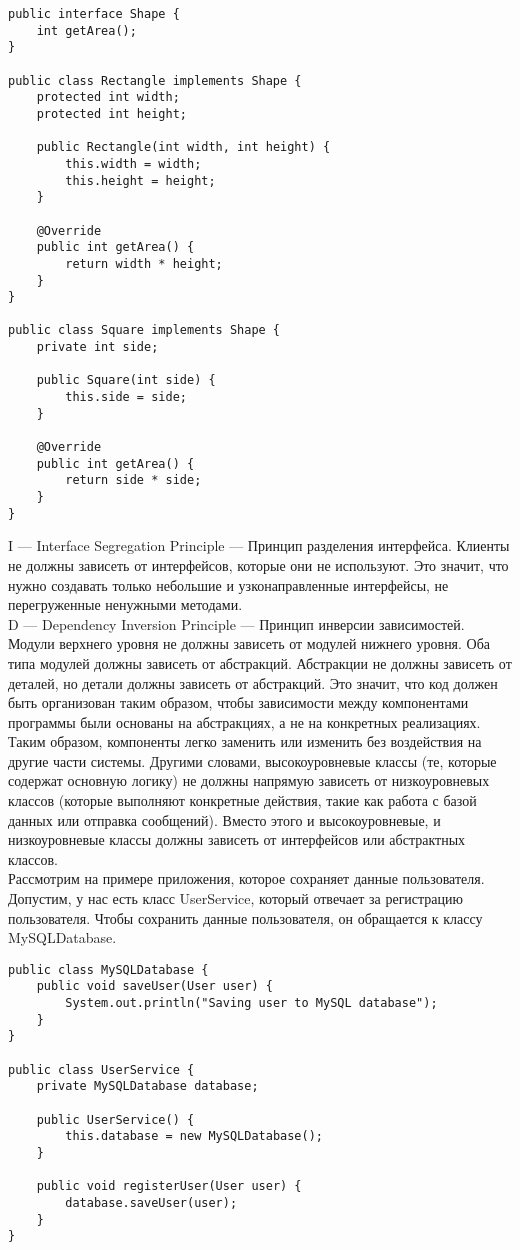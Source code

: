 \begin{lstlisting}
public interface Shape {
    int getArea();
}

public class Rectangle implements Shape {
    protected int width;
    protected int height;

    public Rectangle(int width, int height) {
        this.width = width;
        this.height = height;
    }

    @Override
    public int getArea() {
        return width * height;
    }
}

public class Square implements Shape {
    private int side;

    public Square(int side) {
        this.side = side;
    }

    @Override
    public int getArea() {
        return side * side;
    }
}
\end{lstlisting}
\noindent I — Interface Segregation Principle — Принцип разделения интерфейса. Клиенты не должны зависеть от интерфейсов, которые они не используют. Это значит, что нужно создавать только небольшие и узконаправленные интерфейсы, не перегруженные ненужными методами. \\
\noindent D — Dependency Inversion Principle — Принцип инверсии зависимостей. Модули верхнего уровня не должны зависеть от модулей нижнего уровня. Оба типа модулей должны зависеть от абстракций. Абстракции не должны зависеть от деталей, но детали должны зависеть от абстракций. Это значит, что код должен быть организован таким образом, чтобы зависимости между компонентами программы были основаны на абстракциях, а не на конкретных реализациях. Таким образом, компоненты легко заменить или изменить без воздействия на другие части системы. Другими словами, высокоуровневые классы (те, которые содержат основную логику) не должны напрямую зависеть от низкоуровневых классов (которые выполняют конкретные действия, такие как работа с базой данных или отправка сообщений). Вместо этого и высокоуровневые, и низкоуровневые классы должны зависеть от интерфейсов или абстрактных классов. \\
Рассмотрим на примере приложения, которое сохраняет данные пользователя. Допустим, у нас есть класс UserService, который отвечает за регистрацию пользователя. Чтобы сохранить данные пользователя, он обращается к классу MySQLDatabase. \\
\begin{lstlisting}
public class MySQLDatabase {
    public void saveUser(User user) {
        System.out.println("Saving user to MySQL database");
    }
}

public class UserService {
    private MySQLDatabase database;

    public UserService() {
        this.database = new MySQLDatabase();
    }

    public void registerUser(User user) {
        database.saveUser(user);
    }
}
\end{lstlisting}
